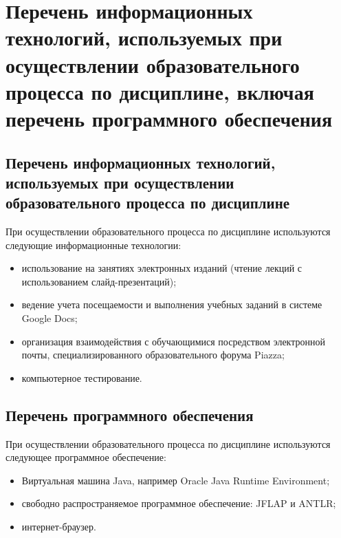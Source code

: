 \documentclass[a4paper,12pt]{article}
\begin{document}
\section{Перечень информационных технологий, используемых при осуществлении образовательного процесса по дисциплине, включая перечень программного обеспечения
}

\subsection{Перечень информационных технологий, используемых при осуществлении образовательного процесса по дисциплине}

При осуществлении образовательного процесса по дисциплине используются следующие информационные технологии:
\begin{itemize}[nolistsep]
  
\item использование на занятиях электронных изданий (чтение лекций с использованием слайд-презентаций);
  
\item ведение учета посещаемости и выполнения учебных заданий в системе Google Docs;
  
\item организация взаимодействия с обучающимися посредством электронной почты, специализированного образовательного форума Piazza;
  
\item компьютерное тестирование.
  
\end{itemize}

\subsection{Перечень программного обеспечения}
При осуществлении образовательного процесса по дисциплине используются следующее программное обеспечение:
\begin{itemize}[nolistsep]
  
\item Виртуальная машина Java, например Oracle Java Runtime Environment;
  
\item свободно распространяемое программное обеспечение: JFLAP и ANTLR;
  
\item интернет-браузер.
  
\end{itemize}
\end{document}
